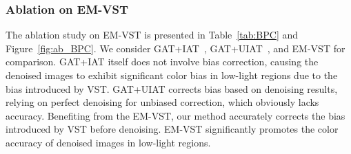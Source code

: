 \documentclass[lettersize,journal]{IEEEtran}
\begin{document}


\subsubsection{\textbf{Ablation on EM-VST}}\label{sec:ab_BPC}
The ablation study on EM-VST is presented in Table~\ref{tab:BPC} and Figure~\ref{fig:ab_BPC}. We consider GAT+IAT~\cite{GAT}, GAT+UIAT~\cite{TIP13/VST}, and EM-VST for comparison. GAT+IAT itself does not involve bias correction, causing the denoised images to exhibit significant color bias in low-light regions due to the bias introduced by VST. GAT+UIAT corrects bias based on denoising results, relying on perfect denoising for unbiased correction, which obviously lacks accuracy. Benefiting from the EM-VST, our method accurately corrects the bias introduced by VST before denoising. EM-VST significantly promotes the color accuracy of denoised images in low-light regions.
\end{document}
